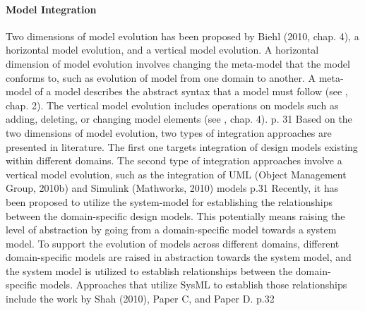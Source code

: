 \documentclass[a4paper,12pt,twoside]{report}
\begin{document}
{	\paragraph{Model Integration}{Two dimensions of model evolution has been proposed by Biehl (2010, chap. 4), a horizontal model evolution, and a vertical model evolution. A horizontal dimension of model evolution involves changing the meta-model that the model conforms to, such as evolution of model from one domain to another. A meta-model of a model describes the abstract syntax that a model must follow (see \cite{SupportingModelEvolutionInModel-drivenDevelopmentOfAutomotiveEmbeddedSystem:Biehl2010}, chap. 2). The vertical model evolution includes operations on models such as adding, deleting, or changing model elements (see \cite{SupportingModelEvolutionInModel-drivenDevelopmentOfAutomotiveEmbeddedSystem:Biehl2010}, chap. 4). \cite{IntegratedApproachMBMechatronicDesign:Qamar2011} p. 31
	\linebreak Based on the two dimensions of model evolution, two types of integration approaches are presented in literature. The first one targets integration of design models existing within different domains. The second type of integration approaches involve a vertical model evolution, such as the integration of UML (Object Management Group, 2010b) and Simulink (Mathworks, 2010) models \cite{IntegratedApproachMBMechatronicDesign:Qamar2011} p.31
	\linebreak Recently, it has been proposed to utilize the system-model for establishing the relationships between the domain-specific design models. This potentially means raising the level of abstraction by going from a domain-specific model towards a system model. To support the evolution of models across different domains, different domain-specific models are raised in abstraction towards the system model, and the system model is utilized to establish relationships between the domain-specific models. Approaches that utilize SysML to establish those relationships include the work by Shah \cite{Multi-view ModelingToSupportEmbeddedSystemsEngineeringInSysML:Shah2010} (2010), Paper C, and Paper D. \cite{IntegratedApproachMBMechatronicDesign:Qamar2011} p.32
	}
	
	
	
}
\end{document}
